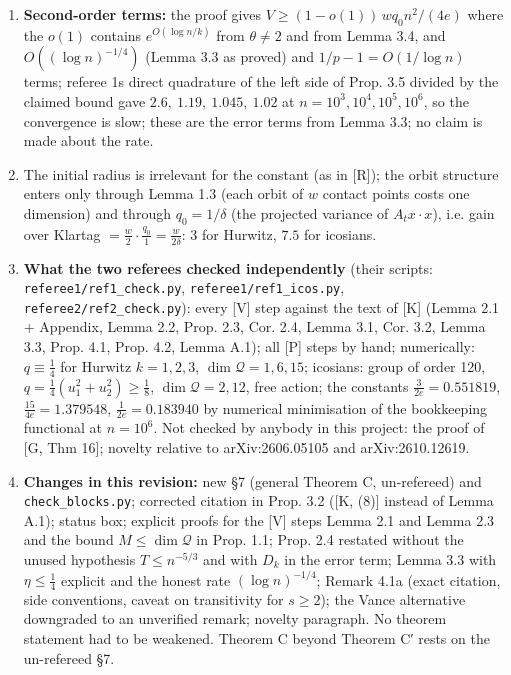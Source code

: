 \begin{enumerate}
  Everything else above is unchanged. (Both (a) and (b) are now supplied in §7, Lemma 7.1 and Lemma 7.2 -\/- un-refereed.)
\item
  \textbf{Second-order terms:} the proof gives \(V\ge(1-o(1))\,w q_0n^2/(4e)\) where the \(o(1)\) contains \(e^{O(\log n/k)}\) from \(\theta\ne2\) and from Lemma 3.4, and \(O((\log n)^{-1/4})\) (Lemma 3.3 as proved) and \(1/p-1=O(1/\log n)\) terms; referee 1\textquotesingle s direct quadrature of the left side of Prop. 3.5 divided by the claimed bound gave \(2.6,\ 1.19,\ 1.045,\ 1.02\) at \(n=10^3,10^4,10^5,10^6\), so the convergence is slow; these are the error terms
  from Lemma 3.3; no claim is made about the rate.
\item
  The initial radius is irrelevant for the constant (as in {[}R{]}); the orbit structure enters only through Lemma 1.3 (each orbit of \(w\) contact points costs one dimension)
  and through \(q_0=1/\delta\) (the projected variance of \(A_tx\cdot x\)), i.e. gain over Klartag \(=\frac{w}{2}\cdot\frac{q_0}{1}=\frac{w}{2\delta}\): \(3\) for Hurwitz, \(7.5\) for icosians.
\item
  \textbf{What the two referees checked independently} (their scripts: \texttt{referee1/ref1\_check.py}, \texttt{referee1/ref1\_icos.py}, \texttt{referee2/ref2\_check.py}): every {[}V{]} step against the text of {[}K{]} (Lemma 2.1 + Appendix, Lemma 2.2, Prop. 2.3, Cor. 2.4, Lemma 3.1, Cor. 3.2, Lemma 3.3, Prop. 4.1, Prop. 4.2, Lemma A.1); all {[}P{]} steps by hand; numerically: \(q\equiv\frac14\) for Hurwitz \(k=1,2,3\), \(\dim\mathcal Q=1,6,15\); icosians: group of order 120, \(q=\frac14(u_1^2+u_2^2)\ge\frac18\), \(\dim\mathcal Q=2,12\), free action; the constants \(\frac3{2e}=0.551819\), \(\frac{15}{4e}=1.379548\), \(\frac1{2e}=0.183940\) by numerical minimisation of the bookkeeping functional at \(n=10^6\). Not checked by anybody in this project: the proof of {[}G, Thm 16{]}; novelty relative to arXiv:2606.05105 and arXiv:2610.12619.
\item
  \textbf{Changes in this revision:} new §7 (general Theorem C, un-refereed) and \texttt{check\_blocks.py}; corrected citation in Prop. 3.2 ({[}K, (8){]} instead of Lemma A.1); status box; explicit proofs for the {[}V{]} steps Lemma 2.1 and Lemma 2.3 and the bound \(M\le\dim\mathcal Q\) in Prop. 1.1; Prop. 2.4 restated without the unused hypothesis \(T\le n^{-5/3}\) and with \(D_k\) in the error term; Lemma 3.3 with \(\eta\le\frac14\) explicit and the honest rate \((\log n)^{-1/4}\); Remark 4.1a (exact citation, side conventions, caveat on transitivity for \(s\ge2\)); the Vance alternative downgraded to an unverified remark; novelty paragraph. No theorem statement had to be weakened. Theorem C beyond Theorem C′ rests on the un-refereed §7.
\end{enumerate}

